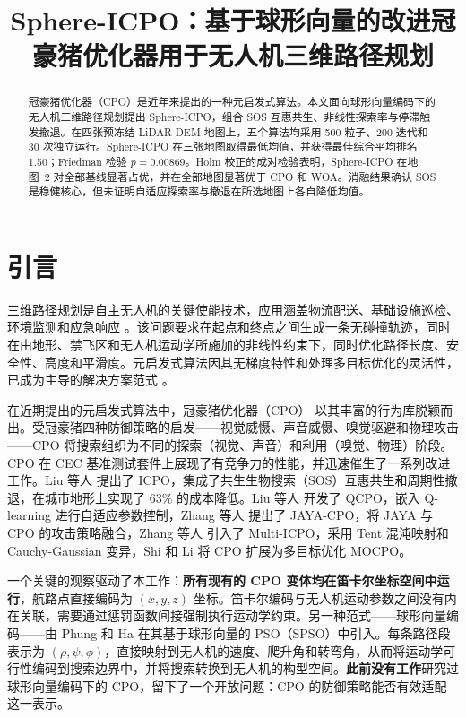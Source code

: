 \documentclass[11pt,a4paper]{ctexart}
\title{Sphere-ICPO：基于球形向量的改进冠豪猪优化器用于无人机三维路径规划}
\author{}
\date{}
\begin{document}
\maketitle

\begin{abstract}
冠豪猪优化器（CPO）是近年来提出的一种元启发式算法。本文面向球形向量编码下的无人机三维路径规划提出 Sphere-ICPO，组合 SOS 互惠共生、非线性探索率与停滞触发撤退。在四张预冻结 LiDAR DEM 地图上，五个算法均采用 500 粒子、200 迭代和 30 次独立运行。Sphere-ICPO 在三张地图取得最低均值，并获得最佳综合平均排名 1.50；Friedman 检验 $p=0.00869$。Holm 校正的成对检验表明，Sphere-ICPO 在地图~2 对全部基线显著占优，并在全部地图显著优于 CPO 和 WOA。消融结果确认 SOS 是稳健核心，但未证明自适应探索率与撤退在所选地图上各自降低均值。
\end{abstract}

\section{引言}

三维路径规划是自主无人机的关键使能技术，应用涵盖物流配送、基础设施巡检、环境监测和应急响应 \cite{icpo2024,qcpo2025,jayacpo2025}。该问题要求在起点和终点之间生成一条无碰撞轨迹，同时在由地形、禁飞区和无人机运动学所施加的非线性约束下，同时优化路径长度、安全性、高度和平滑度。元启发式算法因其无梯度特性和处理多目标优化的灵活性，已成为主导的解决方案范式 \cite{sps2021,cpo2024}。

在近期提出的元启发式算法中，冠豪猪优化器（CPO）\cite{cpo2024} 以其丰富的行为库脱颖而出。受冠豪猪四种防御策略的启发——视觉威慑、声音威慑、嗅觉驱避和物理攻击——CPO 将搜索组织为不同的探索（视觉、声音）和利用（嗅觉、物理）阶段。CPO 在 CEC 基准测试套件上展现了有竞争力的性能，并迅速催生了一系列改进工作。Liu 等人 \cite{icpo2024} 提出了 ICPO，集成了共生生物搜索（SOS）互惠共生和周期性撤退，在城市地形上实现了 63\% 的成本降低。Liu 等人 \cite{qcpo2025} 开发了 QCPO，嵌入 Q-learning 进行自适应参数控制，Zhang 等人 \cite{jayacpo2025} 提出了 JAYA-CPO，将 JAYA 与 CPO 的攻击策略融合，Zhang 等人 \cite{multiicpo2026} 引入了 Multi-ICPO，采用 Tent 混沌映射和 Cauchy-Gaussian 变异，Shi 和 Li \cite{mocpo2026} 将 CPO 扩展为多目标优化 MOCPO。

一个关键的观察驱动了本工作：\textbf{所有现有的 CPO 变体均在笛卡尔坐标空间中运行}，航路点直接编码为 $(x, y, z)$ 坐标。笛卡尔编码与无人机运动参数之间没有内在关联，需要通过惩罚函数间接强制执行运动学约束。另一种范式——球形向量编码——由 Phung 和 Ha \cite{sps2021} 在其基于球形向量的 PSO（SPSO）中引入。每条路径段表示为 $(\rho, \psi, \phi)$，直接映射到无人机的速度、爬升角和转弯角，从而将运动学可行性编码到搜索边界中，并将搜索转换到无人机的构型空间。\textbf{此前没有工作}研究过球形向量编码下的 CPO，留下了一个开放问题：CPO 的防御策略能否有效适配这一表示。
\end{document}
